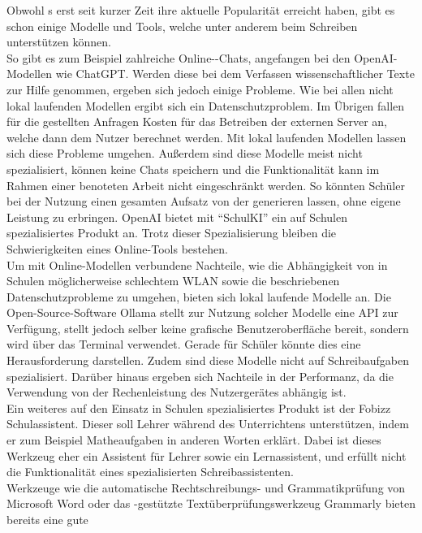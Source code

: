 \documentclass[../main.tex]{subfiles}
\begin{document}
Obwohl s erst seit kurzer Zeit ihre aktuelle Popularität erreicht haben, gibt es schon einige Modelle und Tools, welche unter anderem beim Schreiben unterstützen können. \\
So gibt es zum Beispiel zahlreiche Online--Chats, angefangen bei den OpenAI-Modellen wie ChatGPT. Werden diese bei dem Verfassen wissenschaftlicher Texte zur Hilfe genommen, ergeben 
sich jedoch einige Probleme. Wie bei allen nicht lokal laufenden Modellen ergibt sich ein Datenschutzproblem. Im Übrigen fallen für die gestellten Anfragen Kosten für das Betreiben der 
externen Server an, welche dann dem Nutzer berechnet werden. Mit lokal laufenden Modellen lassen sich diese Probleme umgehen. Außerdem sind diese Modelle meist nicht spezialisiert, 
können keine Chats speichern und die Funktionalität kann im Rahmen einer benoteten Arbeit nicht eingeschränkt werden. So könnten Schüler bei der Nutzung einen gesamten Aufsatz von 
der  generieren lassen, ohne eigene Leistung zu erbringen. OpenAI bietet mit "`SchulKI"' ein auf Schulen spezialisiertes Produkt an. Trotz dieser Spezialisierung bleiben die 
Schwierigkeiten eines Online-Tools bestehen.\cite{schulki}\\ 
Um mit Online-Modellen verbundene Nachteile, wie die Abhängigkeit von in Schulen möglicherweise schlechtem WLAN sowie die beschriebenen Datenschutzprobleme zu umgehen, bieten sich 
lokal laufende Modelle an. Die Open-Source-Software Ollama stellt zur Nutzung solcher Modelle eine API zur Verfügung, stellt jedoch selber keine grafische 
Benutzeroberfläche bereit, sondern wird über das Terminal verwendet. Gerade für Schüler könnte dies eine Herausforderung darstellen. Zudem sind diese Modelle nicht auf Schreibaufgaben 
spezialisiert. Darüber hinaus ergeben sich Nachteile in der Performanz, da die Verwendung von der Rechenleistung des Nutzergerätes abhängig ist.\cite{ollamaSchreibassi}\\
Ein weiteres auf den Einsatz in Schulen spezialisiertes Produkt ist der Fobizz Schulassistent. Dieser soll Lehrer während des Unterrichtens unterstützen, indem er zum Beispiel 
Matheaufgaben in anderen Worten erklärt. Dabei ist dieses Werkzeug eher ein Assistent für Lehrer sowie ein Lernassistent, und erfüllt nicht die Funktionalität eines spezialisierten 
Schreibassistenten.\cite{fobizz}\\ 
Werkzeuge wie die automatische Rechtschreibungs- und Grammatikprüfung von Microsoft Word oder das -gestützte Textüberprüfungswerkzeug Grammarly bieten bereits eine gute 
\end{document}
